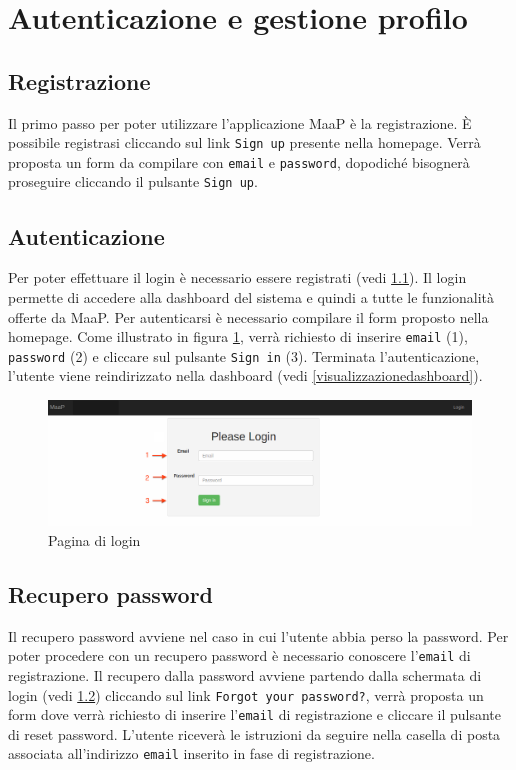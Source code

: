 \section{Autenticazione e gestione profilo}

	\subsection{Registrazione}
	\label{registrazione}

	Il primo passo per poter utilizzare l'applicazione MaaP è la registrazione. \`E possibile registrasi cliccando sul link \texttt{Sign up} presente nella homepage. Verrà proposta un form da compilare con \texttt{email} e \texttt{password}, dopodiché bisognerà proseguire cliccando il pulsante \texttt{Sign up}.

	\nyi

	\subsection{Autenticazione}
	\label{autenticazione}
	Per poter effettuare il login è necessario essere registrati (vedi \ref{registrazione}). Il login permette di accedere alla dashboard del sistema e quindi a tutte le funzionalità offerte da MaaP. Per autenticarsi è necessario compilare il form proposto nella homepage. Come illustrato in figura \ref{fig:login}, verrà richiesto di inserire \texttt{email} (1), \texttt{password} (2) e cliccare sul pulsante \texttt{Sign in} (3). Terminata l'autenticazione, l'utente viene reindirizzato nella dashboard (vedi \ref{visualizzazionedashboard}).

	\begin{figure}[H]
	\label{fig:login}
		\centering \includegraphics[width=1\textwidth]{img/login.png}
	\caption{Pagina di login}
	\end{figure}

	\subsection{Recupero password}
	\label{recuperopassword}
	Il recupero password avviene nel caso in cui l'utente abbia perso la password. Per poter procedere con un recupero password è necessario conoscere l'\texttt{email} di registrazione. Il recupero dalla password avviene partendo dalla schermata di login (vedi \ref{autenticazione}) cliccando sul link \texttt{Forgot your password?}, verrà proposta un form dove verrà richiesto di inserire l'\texttt{email} di registrazione e cliccare il pulsante di reset password. L'utente riceverà le istruzioni da seguire nella casella di posta associata all'indirizzo \texttt{email} inserito in fase di registrazione.

